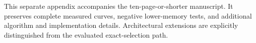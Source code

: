 \documentclass{article}
\begin{document}
\printAffiliationsAndNotice{}
\noindent This separate appendix accompanies the ten-page-or-shorter manuscript.
It preserves complete measured curves, negative lower-memory tests, and
additional algorithm and implementation details. Architectural extensions are
explicitly distinguished from the evaluated exact-selection path.
\appendix







\clearpage


\end{document}
